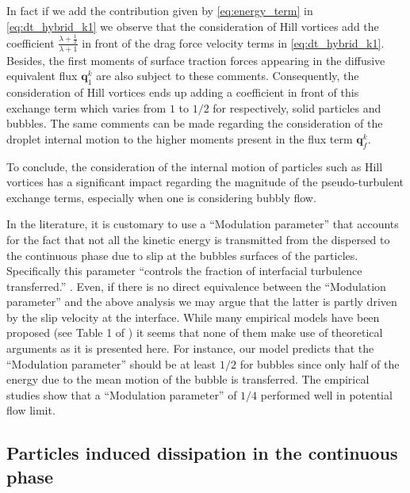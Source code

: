 In fact if we add the contribution given by \ref{eq:energy_term} in \ref{eq:dt_hybrid_k1} we observe that the consideration of Hill vortices add the coefficient $\frac{\lambda +\frac{1}{2}}{\lambda+1}$ in front of the drag force velocity terms in \ref{eq:dt_hybrid_k1}.
Besides, the first moments of surface traction forces appearing in the diffusive equivalent flux $\textbf{q}_1^k$ are also subject to these comments. 
Consequently, the consideration of Hill vortices ends up adding a coefficient in front of this exchange term which varies from $1$ to $1/2$ for respectively, solid particles and bubbles. 
The same comments can be made regarding the consideration of the droplet internal motion to the higher moments present in the flux term $\textbf{q}^k_f$. 

To conclude, the consideration of the internal motion of particles such as Hill vortices has a significant impact regarding the magnitude of the pseudo-turbulent exchange terms, especially when one is considering bubbly flow. 

In the literature\citep{magolan2019quantitative}, it is customary to use a ``Modulation parameter'' that accounts for the fact that not all the kinetic energy is transmitted from the dispersed to the continuous phase due to slip at the bubbles surfaces of the particles.
Specifically this parameter ``controls the fraction of interfacial turbulence transferred.'' \citep{magolan2019quantitative}. 
Even, if there is no direct equivalence between the ``Modulation parameter'' and the above analysis we may argue that the latter is partly driven by the slip velocity at the interface. 
While many empirical models have been proposed (see Table 1 of \citet{magolan2019quantitative}) it seems that none of them make use of theoretical arguments as it is presented here.
For instance, our model predicts that the ``Modulation parameter'' should be at least $1/2$ for bubbles since only half of the energy due to the mean motion of the bubble is transferred. 
The empirical studies show that a ``Modulation parameter'' of $1/4$ performed well \citet{colombo2015multiphase} in potential flow limit. 



\subsection{Particles induced dissipation in the continuous phase}

